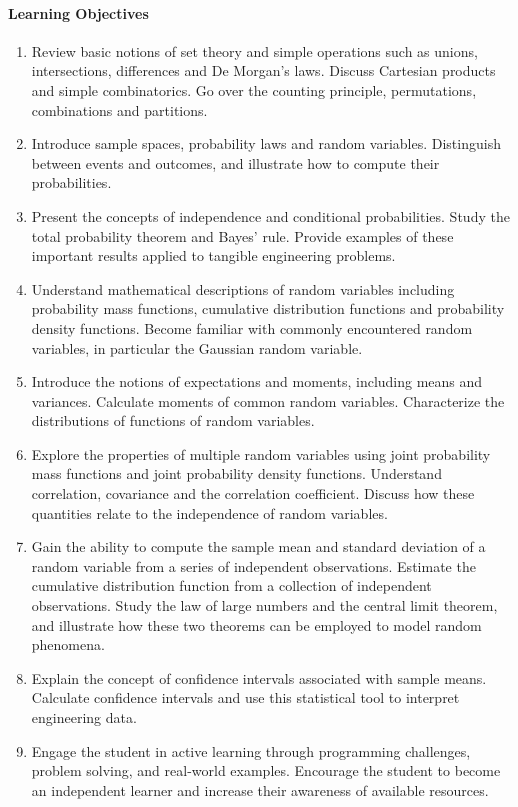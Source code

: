 \documentclass{article}
\begin{document}
\paragraph{Learning Objectives}
\begin{enumerate}
\item
Review basic notions of set theory and simple operations such as unions, intersections, differences and De Morgan's laws.
Discuss Cartesian products and simple combinatorics.
Go over the counting principle, permutations, combinations and partitions.
\item
Introduce sample spaces, probability laws and random variables.
Distinguish between events and outcomes, and illustrate how to compute their probabilities.
\item
Present the concepts of independence and conditional probabilities.
Study the total probability theorem and Bayes' rule.
Provide examples of these important results applied to tangible engineering problems.
\item
Understand mathematical descriptions of random variables including probability mass functions, cumulative distribution functions and probability density functions. 
Become familiar with commonly encountered random variables, in particular the Gaussian random variable.
\item
Introduce the notions of expectations and moments, including means and variances.
Calculate moments of common random variables.
Characterize the distributions of functions of random variables.
\item
Explore the properties of multiple random variables using joint probability mass functions and joint probability density functions.
Understand correlation, covariance and the correlation coefficient.
Discuss how these quantities relate to the independence of random variables.
\item
Gain the ability to compute the sample mean and standard deviation of a random variable from a series of independent observations.
Estimate the cumulative distribution function from a collection of independent observations.
Study the law of large numbers and the central limit theorem, and illustrate how these two theorems can be employed to model random phenomena.
\item
Explain the concept of confidence intervals associated with sample means.
Calculate confidence intervals and use this statistical tool to interpret engineering data.
\item
Engage the student in active learning through programming challenges, problem solving, and real-world examples.
Encourage the student to become an independent learner and increase their awareness of available resources.
\end{enumerate}
\end{document}
